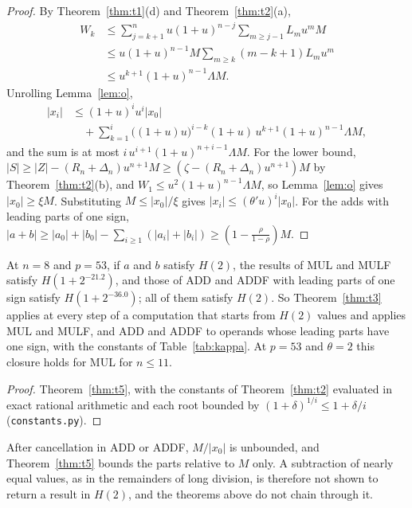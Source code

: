 \begin{proof}
By Theorem~\ref{thm:t1}(d) and Theorem~\ref{thm:t2}(a),
\begin{align*}
W_k &\le \sum_{j=k+1}^{n} u(1+u)^{n-j}\sum_{m \ge j-1}L_mu^mM \\
&\le u(1+u)^{n-1}M\sum_{m \ge k}(m-k+1)L_mu^m \\
&\le u^{k+1}(1+u)^{n-1}\Lambda M.
\end{align*}
Unrolling Lemma~\ref{lem:o},
\begin{align*}
|x_i| &\le (1+u)^iu^i|x_0| \\
&\quad + \sum_{k=1}^{i}\bigl((1+u)u\bigr)^{i-k}(1+u)\,u^{k+1}(1+u)^{n-1}\Lambda M,
\end{align*}
and the sum is at most $i\,u^{i+1}(1+u)^{n+i-1}\Lambda M$. For the lower bound, $|S| \ge |Z| - (R_n+\Delta_n)u^{n+1}M \ge
(\zeta - (R_n+\Delta_n)u^{n+1})M$ by Theorem~\ref{thm:t2}(b), and $W_1 \le u^2(1+u)^{n-1}\Lambda M$, so Lemma~\ref{lem:o}
gives $|x_0| \ge \xi M$. Substituting $M \le |x_0|/\xi$ gives $|x_i| \le (\theta'u)^i|x_0|$. For the adds with leading
parts of one sign, $|a + b| \ge |a_0| + |b_0| - \sum_{i \ge 1}(|a_i| + |b_i|) \ge (1 - \frac{\rho}{1-\rho})M$.
\end{proof}

\begin{corollary}\label{cor:closure}
At $n = 8$ and $p = 53$, if $a$ and $b$ satisfy $H(2)$, the results of MUL and MULF satisfy $H(1 + 2^{-21.2})$, and
those of ADD and ADDF with leading parts of one sign satisfy $H(1 + 2^{-36.0})$; all of them satisfy $H(2)$. So
Theorem~\ref{thm:t3} applies at every step of a computation that starts from $H(2)$ values and applies MUL and MULF,
and ADD and ADDF to operands whose leading parts have one sign, with the constants of Table~\ref{tab:kappa}. At $p =
53$ and $\theta = 2$ this closure holds for MUL for $n \le 11$.
\end{corollary}

\begin{proof}
Theorem~\ref{thm:t5}, with the constants of Theorem~\ref{thm:t2} evaluated in exact rational arithmetic and each
root bounded by $(1 + \delta)^{1/i} \le 1 + \delta/i$ (\texttt{constants.py}).
\end{proof}

After cancellation in ADD or ADDF, $M/|x_0|$ is unbounded, and Theorem~\ref{thm:t5} bounds the parts relative to $M$
only. A subtraction of nearly equal values, as in the remainders of long division, is therefore not shown to return a result
in $H(2)$, and the theorems above do not chain through it.

